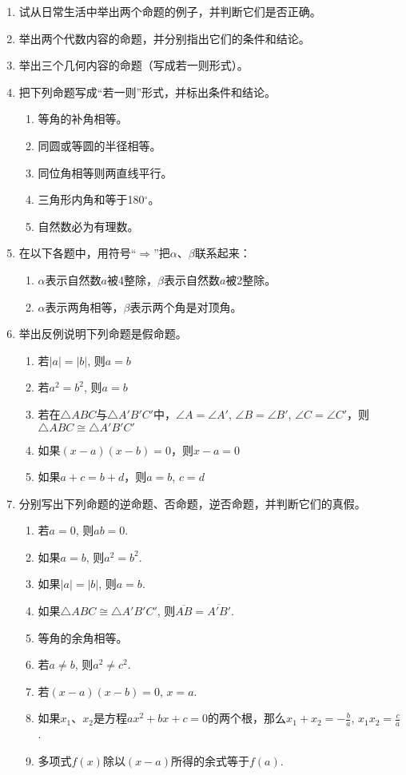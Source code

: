 \begin{ex}
\begin{enumerate}
    \item 试从日常生活中举出两个命题的例子，并判断它们是否正确。
    \item 举出两个代数内容的命题，并分别指出它们的条件和结论。
    \item 举出三个几何内容的命题（写成若一则形式）。
    \item 把下列命题写成“若一则”形式，并标出条件和结论。
\begin{enumerate}
    \item 等角的补角相等。
    \item 同圆或等圆的半径相等。
    \item 同位角相等则两直线平行。
    \item 三角形内角和等于180$^{\circ}$。
    \item 自然数必为有理数。
\end{enumerate}
\item 在以下各题中，用符号“$\Rightarrow$”把$\alpha$、$\beta$联系起来：
\begin{enumerate}
    \item $\alpha$表示自然数$a$被4整除，$\beta$表示自然数$a$被2整除。
    \item $\alpha$表示两角相等，$\beta$表示两个角是对顶角。
\end{enumerate}
\item 举出反例说明下列命题是假命题。
\begin{enumerate}
    \item 若$|a|=|b|$, 则$a=b$
    \item 若$a^2=b^2$, 则$a=b$
    \item 若在$\triangle ABC$与$\triangle A'B'C'$中，$\angle A=\angle A'$, $\angle B=\angle B'$, $\angle C=\angle C'$，则$\triangle ABC\cong \triangle A'B'C'$
    \item 如果$(x-a)(x-b)=0$，则$x-a=0$
    \item 如果$a+c=b+d$，则$a=b$, $c=d$
\end{enumerate}
\item 分别写出下列命题的逆命题、否命题，逆否命题，并判断它们的真假。
\begin{enumerate}
    \item 若$a=0$, 则$ab=0$.
    \item 如果$a=b$, 则$a^2=b^2$.
    \item 如果$|a|=|b|$, 则$a=b$.
    \item 如果$\triangle ABC\cong \triangle A'B'C'$, 则$\overline{AB}=\overline{A'B'}$.
    \item 等角的余角相等。
    \item 若$a\ne b$, 则$a^2\ne c^2$.
    \item 若$(x-a)(x-b)=0$, $x=a$.
    \item 如果$x_1$、$x_2$是方程$ax^2+bx+c=0$的两个根，那么$x_1+x_2=-\frac{b}{a}$, $x_1x_2=\frac{c}{a}$.
    \item 多项式$f(x)$除以$(x-a)$所得的余式等于$f(a)$.
\end{enumerate}
\end{enumerate}
\end{ex}

